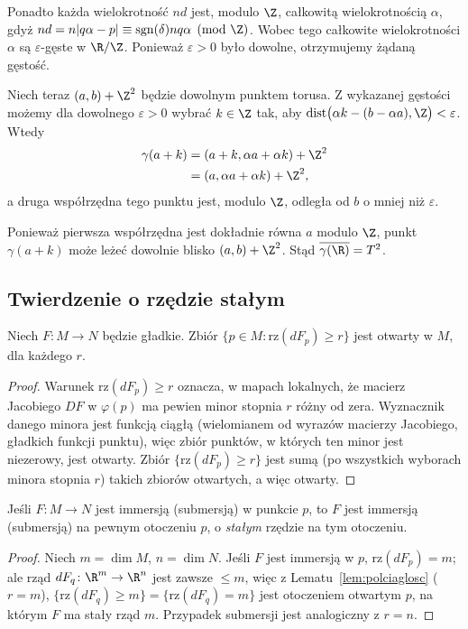 \begin{uwaga}
Ponadto każda wielokrotność $nd$ jest,
modulo $\Z$, całkowitą wielokrotnością
$\alpha$, gdyż $nd=n|q\alpha-p| \equiv \operatorname{sgn}(\delta)nq\alpha \pmod{\Z}$.
Wobec tego całkowite wielokrotności
$\alpha$ są $\varepsilon$-gęste
w $\R/\Z$. Ponieważ $\varepsilon>0$
było dowolne, otrzymujemy żądaną gęstość.

Niech teraz $(a,b)+\Z^2$ będzie dowolnym
punktem torusa. Z wykazanej gęstości
możemy dla dowolnego $\varepsilon>0$
wybrać $k\in\Z$ tak, aby $\operatorname{dist} \bigl(\alpha k-(b-\alpha a),\Z\bigr) <\varepsilon$.
Wtedy
\[
\begin{aligned}
\gamma(a+k)
&=(a+k,\alpha a+\alpha k)+\Z^2\\
&=(a,\alpha a+\alpha k)+\Z^2,
\end{aligned}
\]
a druga współrzędna tego punktu jest,
modulo $\Z$, odległa od $b$ o mniej
niż $\varepsilon$.

Ponieważ pierwsza współrzędna jest
dokładnie równa $a$ modulo $\Z$,
punkt $\gamma(a+k)$ może leżeć
dowolnie blisko $(a,b)+\Z^2$.
Stąd $\overline{\gamma(\R)}=T^2$.
\end{uwaga}


\subsection*{Twierdzenie o rzędzie stałym}

\begin{lemat}\label{lem:polciaglosc}
Niech $F\colon M\to N$ będzie gładkie. Zbiór $\{p\in M:\mathrm{rz}(dF_p)\geq r\}$ jest
otwarty w $M$, dla każdego $r$.
\end{lemat}
\begin{proof}
Warunek $\mathrm{rz}(dF_p)\geq r$ oznacza, w mapach lokalnych, że macierz Jacobiego $DF$ w
$\varphi(p)$ ma pewien minor stopnia $r$ różny od zera. Wyznacznik danego minora jest
funkcją ciągłą (wielomianem od wyrazów macierzy Jacobiego, gładkich funkcji punktu), więc
zbiór punktów, w których ten minor jest niezerowy, jest otwarty. Zbiór $\{\mathrm{rz}
(dF_p)\geq r\}$ jest sumą (po wszystkich wyborach minora stopnia $r$) takich zbiorów
otwartych, a więc otwarty.
\end{proof}

\begin{wniosek}\label{wn:stalyrzad}
Jeśli $F\colon M\to N$ jest immersją (submersją) w punkcie $p$, to $F$ jest immersją
(submersją) na pewnym otoczeniu $p$, o \emph{stałym} rzędzie na tym otoczeniu.
\end{wniosek}
\begin{proof}
Niech $m=\dim M$, $n=\dim N$. Jeśli $F$ jest immersją w $p$, $\mathrm{rz}(dF_p)=m$; ale
rząd $dF_q\colon\R^m\to\R^n$ jest zawsze $\leq m$, więc z Lematu~\ref{lem:polciaglosc}
($r=m$), $\{\mathrm{rz}(dF_q)\geq m\}=\{\mathrm{rz}(dF_q)=m\}$ jest otoczeniem otwartym
$p$, na którym $F$ ma stały rząd $m$. Przypadek submersji jest analogiczny z $r=n$.
\end{proof}


